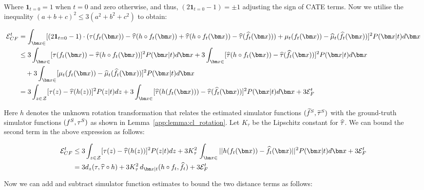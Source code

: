 Where $\mathbf{1}_{t=0}=1$ when $t=0$ and zero otherwise, and thus, $(2\mathbf{1}_{t=0} - 1) = \pm1$ adjusting the sign of CATE terms. Now we utilise the inequality $(a+b+c)^2 \leq 3(a^2 + b^2 + c^2)$ to obtain:

\begin{align*}
    \ErrCF^t &= \int_{\xb \in \xspace}[(2\mathbf{1}_{t=0} - 1)\cdot(\tau( \RInv_t(\xb)) - \tauhat(h \circ \RInv_t(\xb)) + \tauhat(h \circ \RInv_t(\xb)) - \tauhat(\RInvhat_t(\xb)))
    + \realmu_{t}(\RInv_t(\xb))
    - \realmuhat_{t}(\RInvhat_t(\xb))]^2 P(\xb|t)d\xb\\
    &\leq 3\int_{\xb \in \xspace}[\tau(\RInv_t(\xb)) - \tauhat(h \circ \RInv_t(\xb))]^2 P(\xb|t)d\xb + 3\int_{\xb \in \xspace}[\tauhat(h \circ \RInv_t(\xb)) - \tauhat(\RInvhat_t(\xb))]^2 P(\xb|t)d\xb
    \\ &\quad +3\int_{\xb \in \xspace}[\realmu_{t}(\RInv_t(\xb))
    - \realmuhat_{t}(\RInvhat_t(\xb))]^2 P(\xb|t)d\xb\\
    &= 3\int_{z \in \Zspace}[\tau(z) - \tauhat(h(z))]^2 P(z|t)dz + 3\int_{\xb \in \xspace}[\tauhat(h(\RInv_t(\xb))) - \tauhat(\RInvhat_t(\xb))]^2 P(\xb|t)d\xb + 3\ErrF^t
\end{align*}

Here $h$ denotes the unknown rotation transformation that relates the estimated simulator functions $(\widetilde{f}^S, \widetilde{\tau}^S)$ with the ground-truth simulator functions $(f^S, \tau^S)$ as shown in Lemma~\ref{app:lemma:cl_rotation}. Let $K_{\tau}$ be the Lipschitz constant for $\widehat{\tau}$. We can bound the second term in the above expression as follows:

\begin{align*}
    \ErrCF^t &\leq 3\int_{z \in \Zspace}[\tau(z) - \tauhat(h(z))]^2 P(z|t)dz + 3 K_{\tau}^2 \,\int_{\xb \in \xspace}||h(\RInv_t(\xb)) - \RInvhat_t(\xb)||^2 P(\xb|t)d\xb + 3\ErrF^t\\
    &= 3d_z(\tau,\tauhat\circ h) + 3 K_{\tau}^2 \,d_{\xb|t}(h \circ \RInv_t,\RInvhat_t) + 3\ErrF^t
\end{align*}

Now we can add and subtract simulator function estimates to bound the two distance terms as follows:

